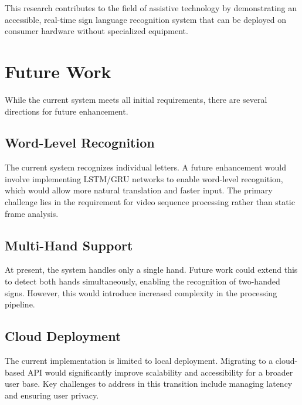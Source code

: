 This research contributes to the field of assistive technology by demonstrating an accessible, real-time sign language recognition system that can be deployed on consumer hardware without specialized equipment.

\vspace{1em}
\section{Future Work}

While the current system meets all initial requirements, there are several directions for future enhancement.

\subsection{Word-Level Recognition}
The current system recognizes individual letters. A future enhancement would involve implementing LSTM/GRU networks to enable word-level recognition, which would allow more natural translation and faster input. The primary challenge lies in the requirement for video sequence processing rather than static frame analysis.

\subsection{Multi-Hand Support}
At present, the system handles only a single hand. Future work could extend this to detect both hands simultaneously, enabling the recognition of two-handed signs. However, this would introduce increased complexity in the processing pipeline.

\subsection{Cloud Deployment}
The current implementation is limited to local deployment. Migrating to a cloud-based API would significantly improve scalability and accessibility for a broader user base. Key challenges to address in this transition include managing latency and ensuring user privacy.